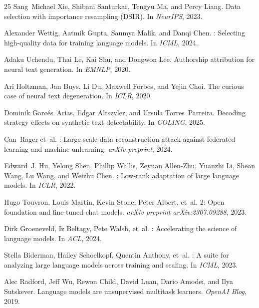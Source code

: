 \documentclass[11pt,a4paper]{article}
\begin{document}
\begin{thebibliography}{25}
Sang~Michael Xie, Shibani Santurkar, Tengyu Ma, and Percy Liang.
\newblock Data selection with importance resampling ({DSIR}).
\newblock In \emph{NeurIPS}, 2023.

Alexander Wettig, Aatmik Gupta, Saumya Malik, and Danqi Chen.
: Selecting high-quality data for training language models.
\newblock In \emph{ICML}, 2024.

Adaku Uchendu, Thai Le, Kai Shu, and Dongwon Lee.
\newblock Authorship attribution for neural text generation.
\newblock In \emph{EMNLP}, 2020.

Ari Holtzman, Jan Buys, Li Du, Maxwell Forbes, and Yejin Choi.
\newblock The curious case of neural text degeneration.
\newblock In \emph{ICLR}, 2020.

Dominik Garc\'es~Arias, Edgar Altszyler, and Ursula Torres~Parreira.
\newblock Decoding strategy effects on synthetic text detectability.
\newblock In \emph{COLING}, 2025.

Can~Rager et~al.
: Large-scale data reconstruction attack against federated learning and machine unlearning.
\newblock \emph{arXiv preprint}, 2024.

Edward~J. Hu, Yelong Shen, Phillip Wallis, Zeyuan Allen-Zhu, Yuanzhi Li, Shean Wang, Lu Wang, and Weizhu Chen.
: Low-rank adaptation of large language models.
\newblock In \emph{ICLR}, 2022.

Hugo Touvron, Louis Martin, Kevin Stone, Peter Albert, et~al.
 2: Open foundation and fine-tuned chat models.
\newblock \emph{arXiv preprint arXiv:2307.09288}, 2023.

Dirk Groeneveld, Iz Beltagy, Pete Walsh, et~al.
: Accelerating the science of language models.
\newblock In \emph{ACL}, 2024.

Stella Biderman, Hailey Schoelkopf, Quentin Anthony, et~al.
: A suite for analyzing large language models across training and scaling.
\newblock In \emph{ICML}, 2023.

Alec Radford, Jeff Wu, Rewon Child, David Luan, Dario Amodei, and Ilya Sutskever.
\newblock Language models are unsupervised multitask learners.
\newblock \emph{OpenAI Blog}, 2019.


\end{thebibliography}
\end{document}
